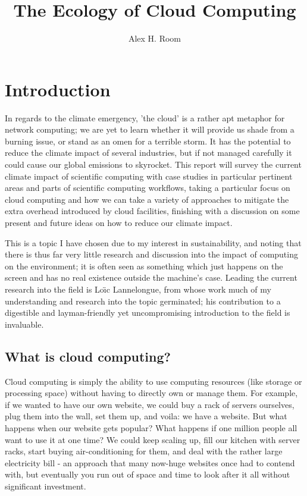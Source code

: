\documentclass{article}
\title{The Ecology of Cloud Computing}
\author{Alex H. Room}
\begin{document}
\maketitle



\section{Introduction}

In regards to the climate emergency, 'the cloud' is a rather apt metaphor for network computing; we are yet to learn whether it will provide us shade from a burning issue, or stand as an omen for a terrible storm. It has the potential to reduce the climate impact of several industries, but if not managed carefully it could cause our global emissions to skyrocket. This report will survey the current climate impact of scientific computing with case studies in particular pertinent areas and parts of scientific computing workflows, taking a particular focus on cloud computing and how we can take a variety of approaches to mitigate the extra overhead introduced by cloud facilities, finishing with a discussion on some present and future ideas on how to reduce our climate impact. \newline

This is a topic I have chosen due to my interest in sustainability, and noting that there is thus far very little research and discussion into the impact of computing on the environment; it is often seen as something which just happens on the screen and has no real existence outside the machine's case. Leading the current research into the field is Lo{\"\i}c Lannelongue, from whose work much of my understanding and research into the topic germinated; his contribution to a digestible and layman-friendly yet uncompromising introduction to the field is invaluable.


\subsection{What is cloud computing?}
Cloud computing is simply the ability to use computing resources (like storage or processing space) without having to directly own or manage them. For example, if we wanted to have our own website, we could buy a rack of servers ourselves, plug them into the wall, set them up, and voila: we have a website. But what happens when our website gets popular? What happens if one million people all want to use it at one time? We could keep scaling up, fill our kitchen with server racks, start buying air-conditioning for them, and deal with the rather large electricity bill - an approach that many now-huge websites once had to contend with, but eventually you run out of space and time to look after it all without significant investment. \newline
\end{document}
